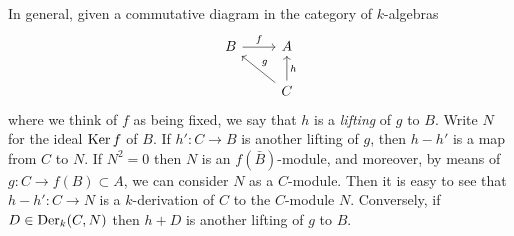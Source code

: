 In general, given a commutative diagram in the category of $k$-algebras
\[
\begin{tikzcd}
B \arrow[r, "f"] & A \\
& C \arrow[ul, "g"'] \arrow[u, "h"']
\end{tikzcd}
\]
where we think of $f$ as being fixed, we say that $h$ is a \emph{lifting} of $g$ to $B$.
Write $N$ for the ideal $\operatorname{Ker} f$ of $B$. If $h'\colon C \to B$ is another lifting of $g$, then
$h - h'$ is a map from $C$ to $N$. If $N^2 = 0$ then $N$ is an $f(\bar{B})$-module, and
moreover, by means of $g\colon C \to f(B) \subset A$, we can consider $N$ as a $C$-module.
Then it is easy to see that $h - h'\colon C \to N$ is a $k$-derivation of $C$ to the
$C$-module $N$. Conversely, if $D \in \operatorname{Der}_k(C, N)$ then $h + D$ is another lifting of $g$
to $B$.

